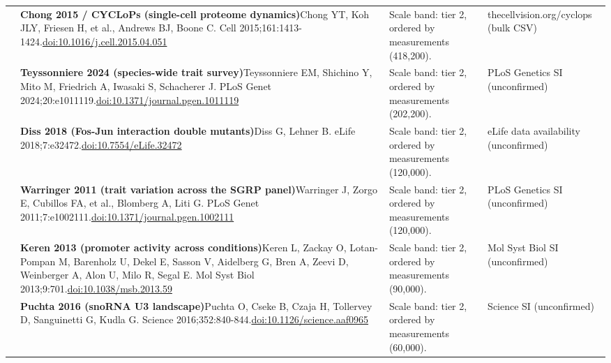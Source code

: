 \begin{landscape}
\begin{longtable}{@{}r@{\hspace{4pt}} L{86mm} L{92mm} L{62mm}@{}}
 & \textbf{Chong 2015 / CYCLoPs (single-cell proteome dynamics)}\newline Chong YT, Koh JLY, Friesen H, et al., Andrews BJ, Boone C. Cell 2015;161:1413-1424.\newline \href{https://doi.org/10.1016/j.cell.2015.04.051}{doi:10.1016/\allowbreak j.cell.2015.04.051} & Scale band: tier 2, ordered by measurements (418,200). & thecellvision.org/\allowbreak cyclops (bulk CSV) \\
 & \textbf{Teyssonniere 2024 (species-wide trait survey)}\newline Teyssonniere EM, Shichino Y, Mito M, Friedrich A, Iwasaki S, Schacherer J. PLoS Genet 2024;20:e1011119.\newline \href{https://doi.org/10.1371/journal.pgen.1011119}{doi:10.1371/\allowbreak journal.pgen.1011119} & Scale band: tier 2, ordered by measurements (202,200). & PLoS Genetics SI (unconfirmed) \\
 & \textbf{Diss 2018 (Fos-Jun interaction double mutants)}\newline Diss G, Lehner B. eLife 2018;7:e32472.\newline \href{https://doi.org/10.7554/eLife.32472}{doi:10.7554/\allowbreak eLife.32472} & Scale band: tier 2, ordered by measurements (120,000). & eLife data availability (unconfirmed) \\
 & \textbf{Warringer 2011 (trait variation across the SGRP panel)}\newline Warringer J, Zorgo E, Cubillos FA, et al., Blomberg A, Liti G. PLoS Genet 2011;7:e1002111.\newline \href{https://doi.org/10.1371/journal.pgen.1002111}{doi:10.1371/\allowbreak journal.pgen.1002111} & Scale band: tier 2, ordered by measurements (120,000). & PLoS Genetics SI (unconfirmed) \\
 & \textbf{Keren 2013 (promoter activity across conditions)}\newline Keren L, Zackay O, Lotan-Pompan M, Barenholz U, Dekel E, Sasson V, Aidelberg G, Bren A, Zeevi D, Weinberger A, Alon U, Milo R, Segal E. Mol Syst Biol 2013;9:701.\newline \href{https://doi.org/10.1038/msb.2013.59}{doi:10.1038/\allowbreak msb.2013.59} & Scale band: tier 2, ordered by measurements (90,000). & Mol Syst Biol SI (unconfirmed) \\
 & \textbf{Puchta 2016 (snoRNA U3 landscape)}\newline Puchta O, Cseke B, Czaja H, Tollervey D, Sanguinetti G, Kudla G. Science 2016;352:840-844.\newline \href{https://doi.org/10.1126/science.aaf0965}{doi:10.1126/\allowbreak science.aaf0965} & Scale band: tier 2, ordered by measurements (60,000). & Science SI (unconfirmed) \\

\end{longtable}
\end{landscape}
